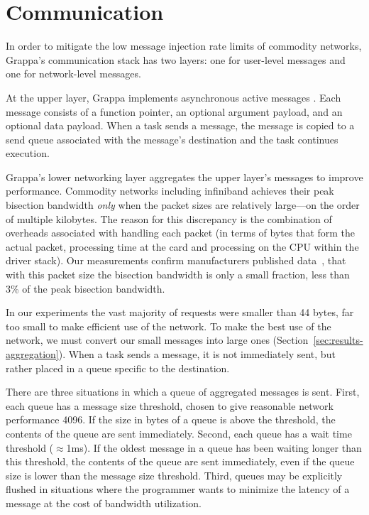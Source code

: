 \section{Communication}

In order to mitigate the low message injection rate limits of commodity
networks, Grappa's communication stack has two layers: one for
user-level messages and one for network-level messages. 

At the upper layer, Grappa implements asynchronous active messages
\cite{vonEicken92}. Each message consists of a function pointer, an
optional argument payload, and an optional data payload. When a task
sends a message, the message is copied to a send queue associated with
the message's destination and the task continues execution.

Grappa's lower networking layer aggregates the upper layer's messages
to improve performance. Commodity networks including infiniband
achieves their peak bisection bandwidth \emph{only} when the packet
sizes are relatively large---on the order of multiple kilobytes. The
reason for this discrepancy is the combination of overheads associated
with handling each packet (in terms of bytes that form the actual
packet, processing time at the card and processing on the
CPU within the driver stack). Our measurements confirm manufacturers
published data~\cite{infinibandbandwidth}, that with this packet size
the bisection bandwidth is only a small fraction, less than
3\% of the peak bisection bandwidth.

In our experiments the vast majority of requests were smaller than
44 bytes, far too small to make
efficient use of the network. To make the best use of the network, we
must convert our small messages into large ones
(Section~\ref{sec:results-aggregation}).  When a task sends a message,
it is not immediately sent, but rather placed in a queue specific to the
destination.

There are three situations in which a queue of aggregated messages is
sent. First, each queue has a message size threshold, chosen to give
reasonable network performance 4096. If the size in
bytes of a queue is above the threshold, the contents of the queue are
sent immediately. Second, each queue has a wait time threshold
($\approx${1ms}). If the oldest message in a queue has been waiting
longer than this threshold, the contents of the queue are sent
immediately, even if the queue size is lower than the message size
threshold.  Third, queues may be explicitly flushed in situations where
the programmer wants to minimize the latency of a message at the cost of
bandwidth utilization.

